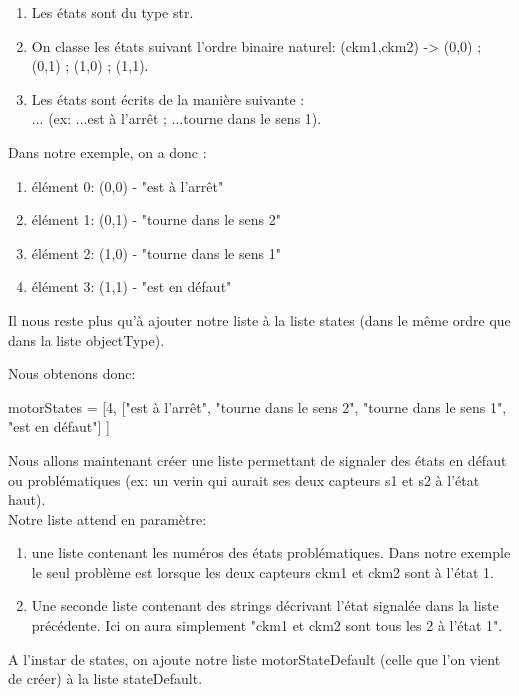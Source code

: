 \begin{enumerate}
    \item Les états sont du type str.
    \item On classe les états suivant l'ordre binaire naturel: (ckm1,ckm2) -> (0,0) ; (0,1) ; (1,0) ; (1,1).
    \item Les états sont écrits de la manière suivante : \\
     ... (ex: ...est à l'arrêt ; ...tourne dans le sens 1).
\end{enumerate}

Dans notre exemple, on a donc : 

\begin{enumerate}
    \item élément 0: (0,0) - "est à l'arrêt"
    \item élément 1: (0,1) - "tourne dans le sens 2"
    \item élément 2: (1,0) - "tourne dans le sens 1"
    \item élément 3: (1,1) - "est en défaut"
\end{enumerate}

Il nous reste plus qu'à ajouter notre liste à la liste states (dans le même ordre que dans la liste objectType).

Nous obtenons donc:

\begin{Python}
    motorStates = [4, ["est à l'arrêt", "tourne dans le sens 2", "tourne dans le sens 1", "est en défaut"] ]
\end{Python}


Nous allons maintenant créer une liste permettant de signaler des états en défaut ou problématiques (ex: un verin qui aurait ses deux capteurs s1 et s2 à l'état haut).\\

Notre liste attend en paramètre:
\begin{enumerate}
    \item une liste contenant les numéros des états problématiques. Dans notre exemple le seul problème est lorsque les deux capteurs ckm1 et ckm2 sont à l'état 1. 
    \item Une seconde liste contenant des strings décrivant l'état signalée dans la liste précédente. Ici on aura simplement "ckm1 et ckm2 sont tous les 2 à l'état 1".
\end{enumerate}

A l'instar de states, on ajoute notre liste motorStateDefault (celle que l'on vient de créer) à la liste stateDefault.

